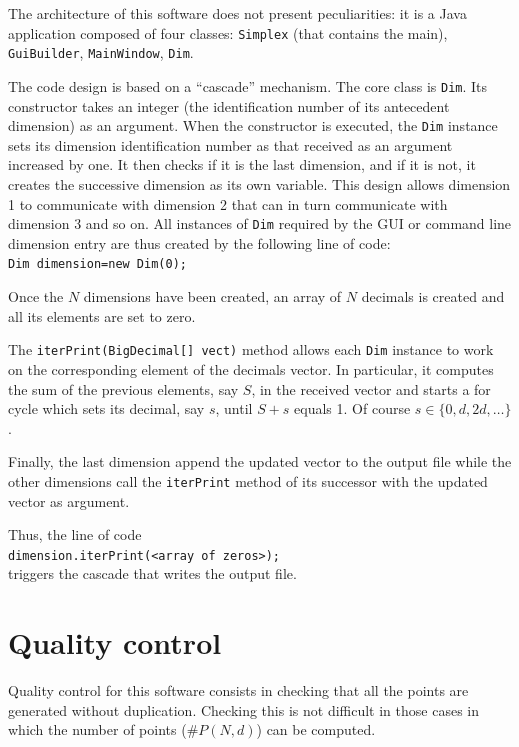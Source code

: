 \documentclass{jors}
\begin{document}
The architecture of this software does not present peculiarities: 
it is a Java application composed of four classes: 
\verb+Simplex+ (that contains the main), \verb+GuiBuilder+, \verb+MainWindow+, \verb+Dim+.

The code design is based on a ``cascade'' mechanism.
The core class is \verb+Dim+. Its constructor takes an integer (the identification number of its antecedent dimension) as an argument. When the constructor is executed, the \verb+Dim+ instance sets its dimension identification number as that received as an argument increased by one. It then checks if it is the last dimension, and if it is not, it creates the successive dimension as its own variable. This design allows dimension 1 to communicate with dimension 2 that can in turn communicate with dimension 3 and so on. All instances of \verb+Dim+ required by the GUI or command line dimension entry are thus created by the following line of code:\\
\verb+Dim dimension=new Dim(0);+

Once the $N$ dimensions have been created, an array of $N$ decimals is created and all its elements are set to zero.  

The \verb+iterPrint(BigDecimal[] vect)+ method allows each \verb+Dim+ instance to work on the corresponding element of the decimals vector. In particular, it computes the sum of the previous elements, say $S$, in the received vector and starts a for cycle which sets its decimal, say $s$, until $S+s$ equals 1. Of course $s \in \{0,d, 2d, \ldots\}$.   

Finally, the last dimension append the updated vector to the output file while the other dimensions call the \verb+iterPrint+ method of its successor with the updated vector as argument.

Thus, the line of code\\ \verb+dimension.iterPrint(<array of zeros>);+\\ triggers the cascade that writes the output file.




\section*{Quality control}

Quality control for this software consists in checking that all the points are generated without duplication. Checking this is not difficult in those cases in which the number of points ($\#P(N,d)$) can be computed.
\end{document}
